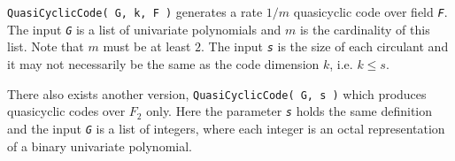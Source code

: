 \documentclass[a4paper,11pt]{report}
\begin{document}
{{{ \texttt{QuasiCyclicCode( G, k, F )} generates a rate $1/m$ quasi\texttt{}cyclic code over field \mbox{\texttt{\mdseries\slshape F}}. The input \mbox{\texttt{\mdseries\slshape G}} is a list of univariate polynomials and $m$ is the cardinality of this list. Note that $m$ must be at least $2$. The input \mbox{\texttt{\mdseries\slshape s}} is the size of each circulant and it may not necessarily be the same as the
code dimension $k$, i.e. $k \le s$. 

 There also exists another version, \texttt{QuasiCyclicCode( G, s )} which produces quasi\texttt{}cyclic codes over $F_2$ only. Here the parameter \mbox{\texttt{\mdseries\slshape s}} holds the same definition and the input \mbox{\texttt{\mdseries\slshape G}} is a list of integers, where each integer is an octal representation of a
binary univariate polynomial. }

}}
\end{document}

